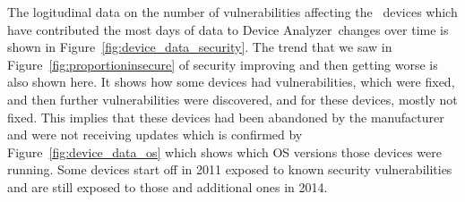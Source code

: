 \documentclass[conference,a4paper,twoside]{IEEEtran}
\newcommand{\da}{Device Analyzer}
\begin{document}
The logitudinal data on the number of vulnerabilities affecting the \daNumDeviceDataDevices\ devices which have contributed the most days of data to \da\ changes over time is shown in Figure~\ref{fig:device_data_security}.
The trend that we saw in Figure~\ref{fig:proportioninsecure} of security improving and then getting worse is also shown here.
It shows how some devices had vulnerabilities, which were fixed, and then further vulnerabilities were discovered, and for these devices, mostly not fixed.
This implies that these devices had been abandoned by the manufacturer and were not receiving updates which is confirmed by Figure~\ref{fig:device_data_os} which shows which OS versions those devices were running.
Some devices start off in 2011 exposed to known security vulnerabilities and are still exposed to those and additional ones in 2014.
\end{document}
